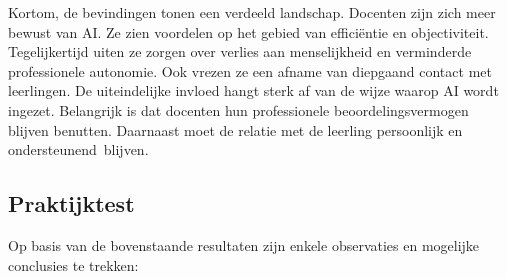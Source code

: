 \documentclass[12pt]{article}
\begin{document}
\begin{multicols}{2}
Kortom, de bevindingen tonen een verdeeld landschap. Docenten zijn zich meer bewust van AI. Ze zien voordelen op het gebied van efficiëntie en objectiviteit. Tegelijkertijd uiten ze zorgen over verlies aan menselijkheid en verminderde professionele autonomie. Ook vrezen ze een afname van diepgaand contact met leerlingen. De uiteindelijke invloed hangt sterk af van de wijze waarop AI wordt ingezet. Belangrijk is dat docenten hun professionele beoordelingsvermogen blijven benutten. Daarnaast moet de relatie met de leerling persoonlijk en ondersteunend blijven.
\end{multicols}
\pagebreak
\subsection{Praktijktest}
Op basis van de bovenstaande resultaten zijn enkele observaties en mogelijke conclusies te trekken:
\end{document}
